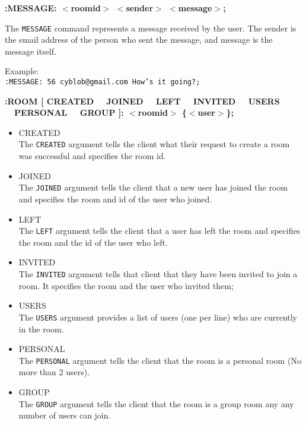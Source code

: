 {\bf :MESSAGE: $<$roomid$>$ $<$sender$>$ $<$message$>$;}

The \texttt{MESSAGE} command represents a message received by the user. The sender is the email address of the person who sent the message, and message is the message itself.

Example: \\
\texttt{:MESSAGE: 56 cyblob@gmail.com How’s it going?;}

{\bf :ROOM [ CREATED \ \vline \ JOINED \ \vline \ LEFT \ \vline \ INVITED \ \vline \ USERS \ \vline \ PERSONAL \ \vline \ GROUP ]: $<$roomid$>$ \{$<$user$>$\};}

\begin{itemize}

\item{CREATED \\
The \texttt{CREATED} argument tells the client what their request to create a room was successful and specifies the room id.}

\item{JOINED \\
The \texttt{JOINED} argument tells the client that a new user has joined the room and specifies the room and id of the user who joined.}

\item{LEFT \\
The \texttt{LEFT} argument tells the client that a user has left the room and specifies the room and the id of the user who left.}

\item{INVITED \\
The \texttt{INVITED} argument tells that client that they have been invited to join a room. It specifies the room and the user who invited them;}

\item{USERS \\
The \texttt{USERS} argument provides a list of users (one per line) who are currently in the room.}

\item{PERSONAL \\
The \texttt{PERSONAL} argument tells the client that the room is a personal room (No more than 2 users).}

\item{GROUP \\
The \texttt{GROUP} argument tells the client that the room is a group room any any number of users can join.}
	
\end{itemize}

